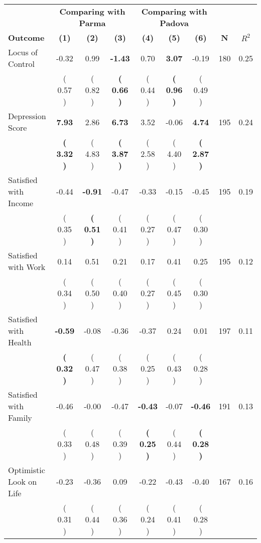 \begin{tabular}{lcccccccc}
\toprule
 & \multicolumn{3}{c}{\textbf{Comparing with Parma}} & \multicolumn{3}{c}{\textbf{Comparing with Padova}} & \\
\cmidrule(lr){2-4} \cmidrule(lr){5-7} 
 \textbf{Outcome} & \textbf{(1)} & \textbf{(2)} & \textbf{(3)} & \textbf{(4)} & \textbf{(5)} & \textbf{(6)} & \textbf{N} & \textbf{$ R^2$} \\
\midrule
Locus of Control &     -0.32 &      0.99 & \textbf{    -1.43} &      0.70 & \textbf{     3.07} &     -0.19 & 180 &       0.25 \\ 
 & (     0.57 ) & (     0.82 ) & \textbf{(     0.66 )} & (     0.44 ) & \textbf{(     0.96 )} & (     0.49 ) & \\
Depression Score & \textbf{     7.93} &      2.86 & \textbf{     6.73} &      3.52 &     -0.06 & \textbf{     4.74} & 195 &       0.24 \\ 
 & \textbf{(     3.32 )} & (     4.83 ) & \textbf{(     3.87 )} & (     2.58 ) & (     4.40 ) & \textbf{(     2.87 )} & \\
Satisfied with Income &     -0.44 & \textbf{    -0.91} &     -0.47 &     -0.33 &     -0.15 &     -0.45 & 195 &       0.19 \\ 
 & (     0.35 ) & \textbf{(     0.51 )} & (     0.41 ) & (     0.27 ) & (     0.47 ) & (     0.30 ) & \\
Satisfied with Work &      0.14 &      0.51 &      0.21 &      0.17 &      0.41 &      0.25 & 195 &       0.12 \\ 
 & (     0.34 ) & (     0.50 ) & (     0.40 ) & (     0.27 ) & (     0.45 ) & (     0.30 ) & \\
Satisfied with Health & \textbf{    -0.59} &     -0.08 &     -0.36 &     -0.37 &      0.24 &      0.01 & 197 &       0.11 \\ 
 & \textbf{(     0.32 )} & (     0.47 ) & (     0.38 ) & (     0.25 ) & (     0.43 ) & (     0.28 ) & \\
Satisfied with Family &     -0.46 &     -0.00 &     -0.47 & \textbf{    -0.43} &     -0.07 & \textbf{    -0.46} & 191 &       0.13 \\ 
 & (     0.33 ) & (     0.48 ) & (     0.39 ) & \textbf{(     0.25 )} & (     0.44 ) & \textbf{(     0.28 )} & \\
Optimistic Look on Life &     -0.23 &     -0.36 &      0.09 &     -0.22 &     -0.43 &     -0.40 & 167 &       0.16 \\ 
 & (     0.31 ) & (     0.44 ) & (     0.36 ) & (     0.24 ) & (     0.41 ) & (     0.28 ) & \\

\end{tabular}
